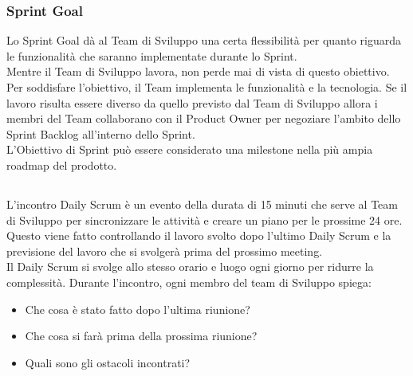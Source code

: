\subsubsection*{Sprint Goal} %
\label{ssub:sprint_goal}
Lo Sprint Goal d\`a al Team di Sviluppo una certa flessibilit\`a per quanto riguarda le funzionalit\`a che saranno implementate 
durante lo Sprint. \newline
\\Mentre il Team di Sviluppo lavora, non perde mai di vista di questo obiettivo. Per soddisfare l'obiettivo, il Team implementa le 
funzionalit\`a e la tecnologia. Se il lavoro risulta essere diverso da quello previsto dal Team di Sviluppo allora i membri 
del Team collaborano con il Product Owner per negoziare l'ambito dello Sprint Backlog all'interno dello Sprint. \newline
\\L'Obiettivo di Sprint pu\`o essere considerato una milestone nella pi\`u ampia roadmap del prodotto.

\subsection*{\color{SteelBlue}{Daily Scrum}}%
\label{sec:dailyscrum}
L'incontro Daily Scrum \`e un evento della durata di 15 minuti che serve al Team di Sviluppo per sincronizzare le attivit\`a e creare un 
piano per le prossime 24 ore. Questo viene fatto controllando il lavoro svolto dopo l'ultimo Daily Scrum e la previsione del lavoro che si 
svolger\`a prima del prossimo meeting. \newline
\\Il Daily Scrum si svolge allo stesso orario e luogo ogni giorno per ridurre la complessit\`a. Durante l'incontro, ogni membro del team di 
Sviluppo spiega:

\begin{itemize}
    \item Che cosa è stato fatto dopo l'ultima riunione?
    \item Che cosa si farà prima della prossima riunione?
    \item Quali sono gli ostacoli incontrati?
\end{itemize}


